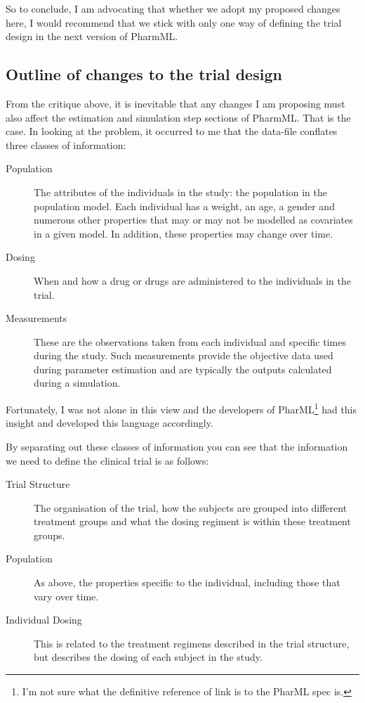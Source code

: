 \documentclass[a4paper,11pt]{article}
\newcommand{\pharmml}{PharmML\xspace}
\begin{document}
%
So to conclude, I am advocating that whether we adopt my proposed
changes here, I would recommend that we stick with only one way of
defining the trial design in the next version of \pharmml.

\subsection{Outline of changes to the trial design}

From the critique above, it is inevitable that any changes I am
proposing must also affect the estimation and simulation step sections
of \pharmml. That is the case. In looking at the problem, it occurred
to me that the data-file conflates three classes of information:
\begin{description}
\item[Population] The attributes of the individuals in the study: the
  population in the population model. Each individual has a weight,
  an age, a gender and numerous other properties that may or may not
  be modelled as covariates in a given model. In addition, these
  properties may change over time.
\item[Dosing] When and how a drug or drugs are administered to the
  individuals in the trial.
\item[Measurements] These are the observations taken from each
  individual and specific times during the study. Such measurements
  provide the objective data used during parameter estimation and are
  typically the outputs calculated during a simulation.
\end{description}
Fortunately, I was not alone in this view and the developers of PharML\footnote{I'm not
  sure what the definitive reference of link is to the PharML spec
  is.} had this insight and developed this language accordingly.

By separating out these classes of information you can see that the
information we need to define the clinical trial is as follows:
\begin{description}
\item[Trial Structure] The organisation of the trial, how the subjects
  are grouped into different treatment groups and what the dosing
  regiment is within these treatment groups.
\item[Population] As above, the properties specific to the individual,
  including those that vary over time.
\item[Individual Dosing] This is related to the treatment regimens
  described in the trial structure, but describes the dosing of each
  subject in the study.
\end{description}
\end{document}
